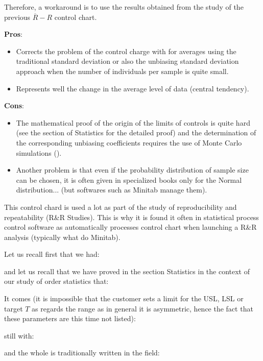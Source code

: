 	Therefore, a workaround is to use the results obtained from the study of the previous $\overline{R}-R$ control chart.
	
	\textbf{Pros}:
	\begin{itemize}
		\item Corrects the problem of the control charge with for averages using the traditional standard deviation or also the unbiasing standard deviation approach when the number of individuals per sample is quite small. 

		\item Represents well the change in the average level of data (central tendency).
	\end{itemize}

	\textbf{Cons}:
	\begin{itemize}
		\item The mathematical proof of the origin of the limits of controls is quite hard (see the section of Statistics for the detailed proof) and the determination of the corresponding unbiasing coefficients requires the use of Monte Carlo simulations (). 

		\item Another problem is that even if the probability distribution of sample size can be chosen, it is often given in specialized books only for the Normal distribution... (but softwares such as Minitab manage them).
 	\end{itemize}
 	\begin{tcolorbox}[title=Remark,colframe=black,arc=10pt]
	This control chard is used a lot as part of the study of reproducibility and repeatability (R\&R Studies). This is why it is found it often in statistical process control software as automatically processes control chart when launching a R\&R analysis (typically what do Minitab).
	\end{tcolorbox}
	Let us recall first that we had:
	
	and let us recall that we have proved in the section Statistics in the context of our study of order statistics that:
	
	It comes (it is impossible that the customer sets a limit for the USL, LSL or target $T$ as regards the range as in general it is asymmetric, hence the fact that these parameters are this time not listed):
	
	still with:
	
	and the whole is traditionally written in the field:
	
